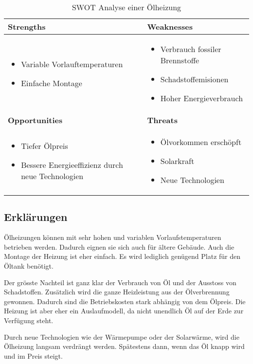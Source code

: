 \begin{table}[h!]
\begin{tabular}[c]{|p{}|p{}|}
  \hline
  \textbf{Strengths} &
  \textbf{Weaknesses} \\ \hline
  
  \begin{itemize}
    \item Variable Vorlauftemperaturen
    \item Einfache Montage
  \end{itemize}
  &
  
  \begin{itemize}
    \item Verbrauch fossiler Brennstoffe
    \item Schadstoffemisionen
    \item Hoher Energieverbrauch
  \end{itemize}
  \\ \hline
  
  \textbf{Opportunities} &
  \textbf{Threats} \\ \hline
  
  \begin{itemize}
    \item Tiefer Ölpreis
    \item Bessere Energieeffizienz durch neue Technologien
  \end{itemize}
  &
  
  \begin{itemize}
  	\item Ölvorkommen erschöpft
    \item Solarkraft
    \item Neue Technologien
  \end{itemize}  
  \\ \hline
\end{tabular}
\label{swot:warmepumpe}
\caption{SWOT Analyse einer Ölheizung}
\end{table}

\subsection{Erklärungen}

Ölheizungen können mit sehr hohen und variablen Vorlaufstemperaturen betrieben werden. Dadurch eignen sie sich auch für ältere Gebäude. 
Auch die Montage der Heizung ist eher einfach. Es wird lediglich genügend Platz für den Öltank benötigt.

Der grösste Nachteil ist ganz klar der Verbrauch von Öl und der Ausstoss von Schadstoffen. Zusätzlich wird die ganze Heizleistung aus der Ölverbrennung gewonnen.
Dadurch sind die Betriebskosten stark abhängig von dem Ölpreis.
Die Heizung ist aber eher ein Auslaufmodell, da nicht unendlich Öl auf der Erde zur Verfügung steht.

Durch neue Technologien wie der Wärmepumpe oder der Solarwärme, wird die Ölheizung langsam verdrängt werden. Spätestens dann, wenn das Öl knapp wird und im Preis steigt.


